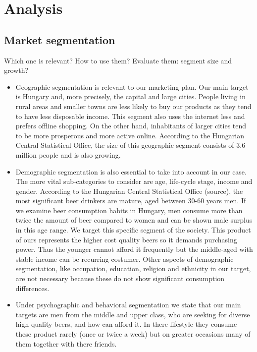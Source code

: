 \newpage
\section{Analysis}
\subsection{Market segmentation}

Which one is relevant? How to use them? Evaluate them: segment size and growth?
\begin{itemize}
   \item Geographic segmentation is relevant to our marketing plan. Our main target is Hungary and, more precisely, the capital and large cities. People living in rural areas and smaller towns are less likely to buy our products as they tend to have less disposable income. This segment also uses the internet less and prefers offline shopping. On the other hand, inhabitants of larger cities tend to be more prosperous and more active online. According to the Hungarian Central Statistical Office, the size of this geographic segment consists of 3.6 million people and is also growing. \cite{ksh1}

   \item Demographic segmentation is also essential to take into account in our case. The more vital sub-categories to consider are age, life-cycle stage, income and gender. According to the Hungarian Central Statistical Office (source), the most significant beer drinkers are mature, aged between 30-60 years men. If we examine beer consumption habits in Hungary, men consume more than twice the amount of beer compared to women and can be shown male surplus in this age range. We target this specific segment of the society. This product of ours represents the higher cost quality beers so it demands purchasing power. Thus the younger cannot afford it frequently but the middle-aged with stable income can be recurring costumer. Other aspects of demographic segmentation, like occupation, education, religion and ethnicity in our target, are not necessary because these do not show significant consumption differences.

   \item Under psychographic and behavioral segmentation we state that our main targets are men from the middle and upper class, who are seeking for diverse high quality beers, and how can afford it. In there lifestyle they consume these product rarely (once or twice a week) but on greater occasions many of them together with there friends.
\end{itemize}

